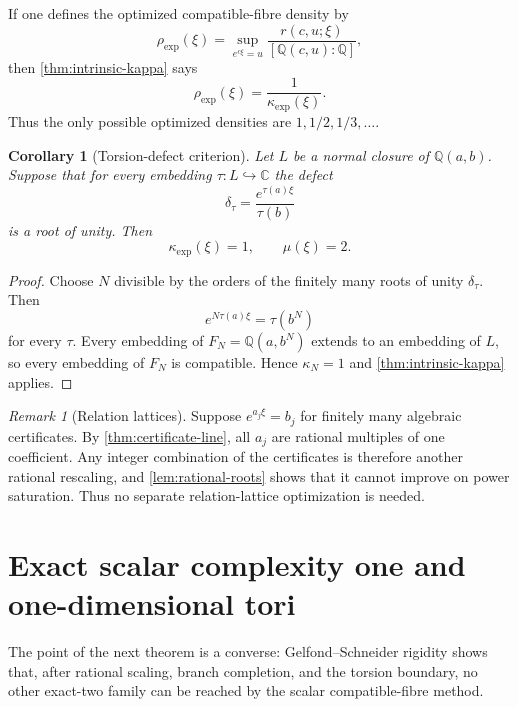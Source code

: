 \documentclass[11pt]{article}
\newcommand{\CC}{\mathbb C}
\newcommand{\QQ}{\mathbb Q}
\newtheorem{corollary}[theorem]{Corollary}
\theoremstyle{definition}
\theoremstyle{remark}
\newtheorem{remark}[theorem]{Remark}
\numberwithin{equation}{section}
\begin{document}
If one defines the optimized compatible-fibre density by
\[
 \rho_{\exp}(\xi)=
 \sup_{e^{c\xi}=u}
 \frac{r(c,u;\xi)}{[\QQ(c,u):\QQ]},
\]
then \cref{thm:intrinsic-kappa} says
\begin{equation}\label{eq:density-reciprocal}
 \boxed{\rho_{\exp}(\xi)=\frac1{\kappa_{\exp}(\xi)}.}
\end{equation}
Thus the only possible optimized densities are
$1,1/2,1/3,\ldots$.

\begin{corollary}[Torsion-defect criterion]\label{cor:torsion-new}
Let $L$ be a normal closure of $\QQ(a,b)$.  Suppose that for every
embedding $\tau:L\hookrightarrow\CC$ the defect
\[
 \delta_\tau=\frac{e^{\tau(a)\xi}}{\tau(b)}
\]
is a root of unity.  Then
\[
 \boxed{\kappa_{\exp}(\xi)=1,
 \qquad \mu(\xi)=2.}
\]
\end{corollary}

\begin{proof}
Choose $N$ divisible by the orders of the finitely many roots of unity
$\delta_\tau$.  Then
\[
 e^{N\tau(a)\xi}=\tau(b^N)
\]
for every $\tau$.  Every embedding of $F_N=\QQ(a,b^N)$ extends to an
embedding of $L$, so every embedding of $F_N$ is compatible.  Hence
$\kappa_N=1$ and \cref{thm:intrinsic-kappa} applies.
\end{proof}

\begin{remark}[Relation lattices]
Suppose $e^{a_j\xi}=b_j$ for finitely many algebraic certificates.
By \cref{thm:certificate-line}, all $a_j$ are rational multiples of
one coefficient.  Any integer combination of the certificates is
therefore another rational rescaling, and
\cref{lem:rational-roots} shows that it cannot improve on power
saturation.  Thus no separate relation-lattice optimization is needed.
\end{remark}

\section{Exact scalar complexity one and one-dimensional tori}
\label{sec:classification}

The point of the next theorem is a converse: Gelfond--Schneider
rigidity shows that, after rational scaling, branch completion, and the
torsion boundary, no other exact-two family can be reached by the scalar
compatible-fibre method.
\end{document}
